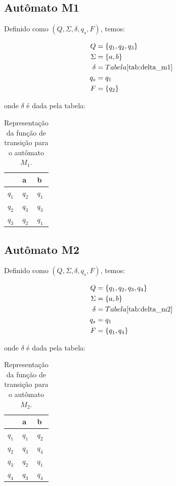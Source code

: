 \documentclass[a4paper, 12pt]{article}
\begin{document}
\subsection{Autômato M1}
Definido como $(Q, \Sigma, \delta, q_s, F)$, temos:

\begin{align*}
    Q &= \{q_1, q_2, q_3\} \\
    \Sigma &= \{a, b\} \\
    \delta &= Tabela \text{\ref{tab:delta_m1}} \\
    q_s &= q_1 \\
    F &= \{q_2\}
\end{align*}

onde $\delta$ é dada pela tabela:

\begin{table}[!h]
    \centering
    \begin{tabular}{l|ll}
              & a     & b     \\ 
        \hline \hline
        $q_1$ & $q_2$ & $q_1$ \\
        $q_2$ & $q_3$ & $q_3$ \\
        $q_3$ & $q_2$ & $q_1$ \\
    \end{tabular}
    \caption{Representação da função de transição para o autômato $M_1$.}
    \label{tab:delta_m1}
\end{table}

\subsection{Autômato M2}
Definido como $(Q, \Sigma, \delta, q_s, F)$, temos:

\begin{align*}
    Q &= \{q_1, q_2, q_3, q_4\} \\
    \Sigma &= \{a, b\} \\
    \delta &= Tabela \text{\ref{tab:delta_m2}} \\
    q_s &= q_1 \\
    F &= \{q_1, q_4\}
\end{align*}

onde $\delta$ é dada pela tabela:

\begin{table}[!h]
    \centering
    \begin{tabular}{l|ll}
              & a     & b     \\ 
        \hline \hline
        $q_1$ & $q_1$ & $q_2$ \\
        $q_2$ & $q_3$ & $q_4$ \\
        $q_3$ & $q_2$ & $q_1$ \\
        $q_4$ & $q_3$ & $q_4$ \\
    \end{tabular}
    \caption{Representação da função de transição para o autômato $M_2$.}
    \label{tab:delta_m2}
\end{table}
\end{document}
